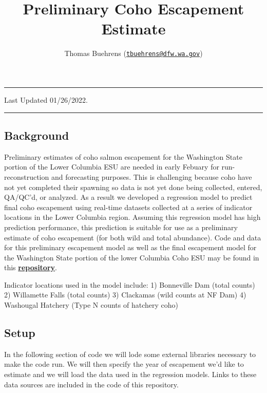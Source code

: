 \documentclass[
]{article}
\title{Preliminary Coho Escapement Estimate}
\author{Thomas Buehrens
(\href{mailto:tbuehrens@dfw.wa.gov}{\nolinkurl{tbuehrens@dfw.wa.gov}})}
\date{}
\begin{document}
\maketitle

{
\setcounter{tocdepth}{3}
\tableofcontents
}
\begin{center}\rule{0.5\linewidth}{0.5pt}\end{center}

Last Updated 01/26/2022.

\begin{center}\rule{0.5\linewidth}{0.5pt}\end{center}

\hypertarget{background}{%
\subsection{Background}\label{background}}

Preliminary estimates of coho salmon escapement for the Washington State
portion of the Lower Columbia ESU are needed in early Febuary for
run-reconstruction and forecasting purposes. This is challenging because
coho have not yet completed their spawning so data is not yet done being
collected, entered, QA/QC'd, or analyzed. As a result we developed a
regression model to predict final coho escapement using real-time
datasets collected at a series of indicator locations in the Lower
Columbia region. Assuming this regression model has high prediction
performance, this prediction is suitable for use as a preliminary
estimate of coho escapement (for both wild and total abundance). Code
and data for this preliminary escapement model as well as the final
escapement model for the Washington State portion of the lower Columbia
Coho ESU may be found in this
\href{https://github.com/tbuehrens/LCR_Coho_Escapement}{\textbf{repository}}.

Indicator locations used in the model include: 1) Bonneville Dam (total
counts) 2) Willamette Falls (total counts) 3) Clackamas (wild counts at
NF Dam) 4) Washougal Hatchery (Type N counts of hatchery coho)

\hypertarget{setup}{%
\subsection{Setup}\label{setup}}

In the following section of code we will lode some external libraries
necessary to make the code run. We will then specify the year of
escapement we'd like to estimate and we will load the data used in the
regression models. Links to these data sources are included in the code
of this repository.
\end{document}
